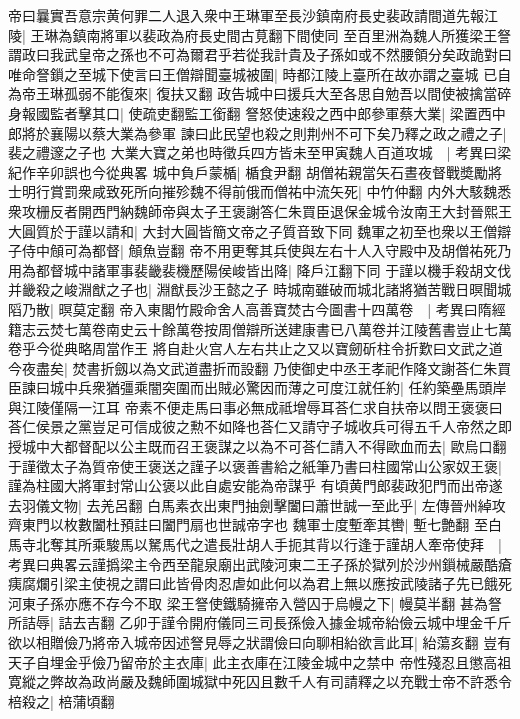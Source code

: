 帝曰曩實吾意宗黄何罪二人退入衆中王琳軍至長沙鎮南府長史裴政請間道先報江陵|{
	王琳為鎮南將軍以裴政為府長史間古莧翻下間使同}
至百里洲為魏人所獲梁王詧謂政曰我武皇帝之孫也不可為爾君乎若從我計貴及子孫如或不然腰領分矣政詭對曰唯命詧鎻之至城下使言曰王僧辯聞臺城被圍|{
	時都江陵上臺所在故亦謂之臺城}
已自為帝王琳孤弱不能復來|{
	復扶又翻}
政告城中曰援兵大至各思自勉吾以間使被擒當碎身報國監者擊其口|{
	使疏吏翻監工銜翻}
詧怒使速殺之西中郎參軍蔡大業|{
	梁置西中郎將於襄陽以蔡大業為參軍}
諫曰此民望也殺之則荆州不可下矣乃釋之政之禮之子|{
	裴之禮邃之子也}
大業大寶之弟也時徵兵四方皆未至甲寅魏人百道攻城　|{
	考異曰梁紀作辛卯誤也今從典畧}
城中負戶蒙楯|{
	楯食尹翻}
胡僧祐親當矢石晝夜督戰奬勵將士明行賞罰衆咸致死所向摧殄魏不得前俄而僧祐中流矢死|{
	中竹仲翻}
内外大駭魏悉衆攻栅反者開西門納魏師帝與太子王褒謝答仁朱買臣退保金城令汝南王大封晉熙王大圓質於于謹以請和|{
	大封大圓皆簡文帝之子質音致下同}
魏軍之初至也衆以王僧辯子侍中頠可為都督|{
	頠魚豈翻}
帝不用更奪其兵使與左右十人入守殿中及胡僧祐死乃用為都督城中諸軍事裴畿裴機歷陽侯峻皆出降|{
	降戶江翻下同}
于謹以機手殺胡文伐并畿殺之峻淵猷之子也|{
	淵猷長沙王懿之子}
時城南雖破而城北諸將猶苦戰日暝聞城䧟乃散|{
	暝莫定翻}
帝入東閣竹殿命舍人高善寶焚古今圖書十四萬卷　|{
	考異曰隋經籍志云焚七萬卷南史云十餘萬卷按周僧辯所送建康書已八萬卷并江陵舊書豈止七萬卷乎今從典略周當作王}
將自赴火宫人左右共止之又以寶劒斫柱令折歎曰文武之道今夜盡矣|{
	焚書折劔以為文武道盡折而設翻}
乃使御史中丞王孝祀作降文謝荅仁朱買臣諫曰城中兵衆猶彊乘闇突圍而出賊必驚因而薄之可度江就任約|{
	任約築壘馬頭岸與江陵僅隔一江耳}
帝素不便走馬曰事必無成祗增辱耳荅仁求自扶帝以問王褒褒曰荅仁侯景之黨豈足可信成彼之勲不如降也荅仁又請守子城收兵可得五千人帝然之即授城中大都督配以公主既而召王褒謀之以為不可荅仁請入不得歐血而去|{
	歐烏口翻}
于謹徵太子為質帝使王褒送之謹子以褒善書給之紙筆乃書曰柱國常山公家奴王褒|{
	謹為柱國大將軍封常山公褒以此自處安能為帝謀乎}
有頃黄門郎裴政犯門而出帝遂去羽儀文物|{
	去羌呂翻}
白馬素衣出東門抽劍擊闔曰蕭世誠一至此乎|{
	左傳晉州綽攻齊東門以枚數闔杜預註曰闔門扇也世誠帝字也}
魏軍士度塹牽其轡|{
	塹七艶翻}
至白馬寺北奪其所乘駿馬以駑馬代之遣長壯胡人手扼其背以行逢于謹胡人牽帝使拜　|{
	考異曰典畧云謹撝梁主令西至龍泉廟出武陵河東二王子孫於獄列於沙州鎻械嚴酷瘡痍腐爛引梁主使視之謂曰此皆骨肉忍虐如此何以為君上無以應按武陵諸子先已餓死河東子孫亦應不存今不取}
梁王詧使鐵騎擁帝入營囚于烏幔之下|{
	幔莫半翻}
甚為詧所詰辱|{
	詰去吉翻}
乙卯于謹令開府儀同三司長孫儉入據金城帝紿儉云城中埋金千斤欲以相贈儉乃將帝入城帝因述詧見辱之狀謂儉曰向聊相紿欲言此耳|{
	紿蕩亥翻}
豈有天子自埋金乎儉乃留帝於主衣庫|{
	此主衣庫在江陵金城中之禁中}
帝性殘忍且懲高祖寛縱之弊故為政尚嚴及魏師圍城獄中死囚且數千人有司請釋之以充戰士帝不許悉令棓殺之|{
	棓蒲頃翻}
